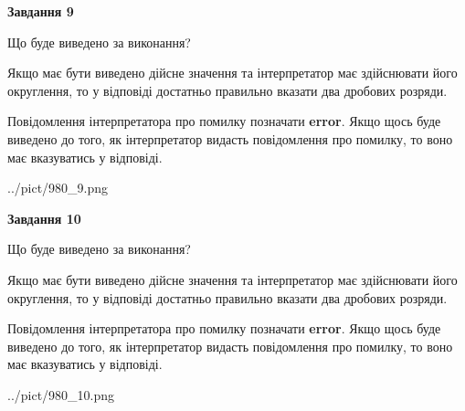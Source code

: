 \documentclass[12pt, ukrainian]{article}
\begin{document}
{\begin {Large}
{\begin {center}\textbf{Завдання 9}\end {center}}\par
Що буде виведено за виконання? \par

Якщо має бути виведено дійсне значення та інтерпретатор має здійснювати його округлення, 
то у відповіді достатньо правильно вказати два дробових розряди.

Повідомлення інтерпретатора про помилку позначати \textbf{error}.
Якщо щось буде виведено до того, як інтерпретатор видасть повідомлення про помилку, 
то воно має вказуватись у відповіді. \par

\begin{center}
	{../pict/980_9.png}
\end{center}
\newpage

{\begin {center}\textbf{Завдання 10}\end {center}}\par
Що буде виведено за виконання? \par

Якщо має бути виведено дійсне значення та інтерпретатор має здійснювати його округлення, 
то у відповіді достатньо правильно вказати два дробових розряди.

Повідомлення інтерпретатора про помилку позначати \textbf{error}.
Якщо щось буде виведено до того, як інтерпретатор видасть повідомлення про помилку, 
то воно має вказуватись у відповіді. \par

\begin{center}
	{../pict/980_10.png}
\end{center}
\newpage

\end {Large}}
\end{document}
